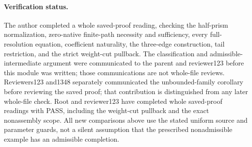 \paragraph{Verification status.}
The author completed a whole saved-proof reading, checking the
half-prism normalization, zero-native finite-path necessity and
sufficiency, every full-resolution equation, coefficient naturality,
the three-edge construction, tail restriction, and the strict
weight-cut pullback.  The classification and admissible-intermediate
argument were communicated to the parent and reviewer123 before
this module was written; those communications are not whole-file
reviews.  Reviewers123 and1348 separately communicated the
unbounded-family corollary before reviewing the saved proof;
that contribution is distinguished from any later whole-file check.
Root and reviewer123 have completed whole saved-proof readings with
PASS, including the weight-cut pullback and the exact nonassembly scope.
All new comparisons above use the stated uniform source and
parameter guards, not a silent assumption that the prescribed
nonadmissible example has an admissible completion.
